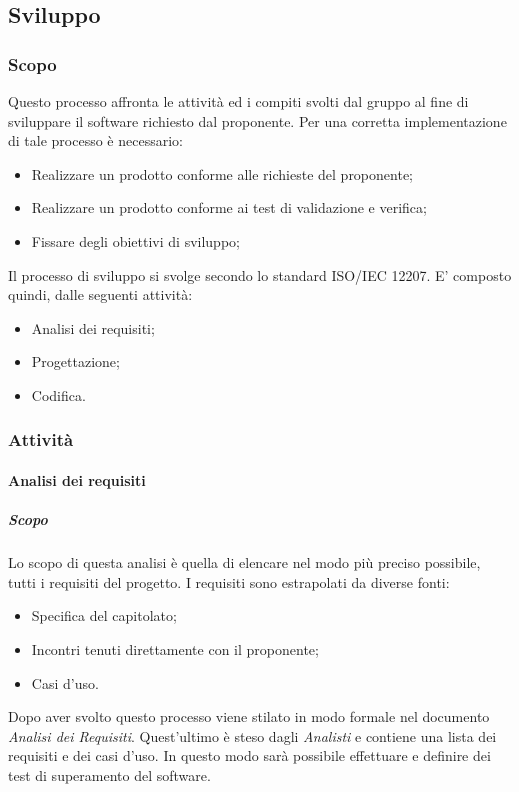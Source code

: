 \subsection{Sviluppo}
	\subsubsection{Scopo}
	Questo processo affronta le attività ed i compiti svolti dal gruppo al fine di sviluppare il software richiesto dal proponente. Per una corretta implementazione di tale processo è necessario:
	\begin{itemize}
		\item Realizzare un prodotto conforme alle richieste del proponente;
		\item Realizzare un prodotto conforme ai test di validazione e verifica;
		\item Fissare degli obiettivi di sviluppo;
	\end{itemize}
     Il processo di sviluppo si svolge secondo lo standard ISO/IEC 12207. E' composto quindi, dalle seguenti attività:
     	\begin{itemize}
     	\item Analisi dei requisiti;
     	\item Progettazione;
     	\item Codifica.
     \end{itemize}
     
	

	\subsubsection{Attività}
		\paragraph{Analisi dei requisiti}
			\subparagraph{Scopo} \Spazio
			Lo scopo di questa analisi è quella di elencare nel modo più preciso possibile, tutti i requisiti del progetto. 
			I requisiti sono estrapolati da diverse fonti:
				\begin{itemize}
				\item Specifica del capitolato;
				\item Incontri tenuti direttamente con il proponente;
				\item Casi d'uso.
			\end{itemize}
		    Dopo aver svolto questo processo viene stilato in modo formale nel documento \textit{Analisi dei Requisiti}.
		    Quest'ultimo è steso dagli \emph{Analisti} e contiene una lista dei requisiti e dei casi d'uso.
		    In questo modo sarà possibile effettuare e definire dei test di superamento del software. 

